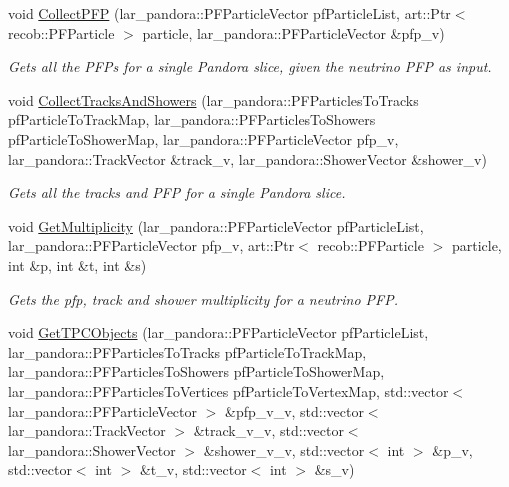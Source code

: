 \begin{DoxyCompactItemize}
\item 
void \hyperlink{group__UBXSec_ga9572bb5f180624d28ed9055591d633eb}{Collect\-P\-F\-P} (lar\-\_\-pandora\-::\-P\-F\-Particle\-Vector pf\-Particle\-List, art\-::\-Ptr$<$ recob\-::\-P\-F\-Particle $>$ particle, lar\-\_\-pandora\-::\-P\-F\-Particle\-Vector \&pfp\-\_\-v)
\begin{DoxyCompactList}\small\item\em Gets all the P\-F\-Ps for a single Pandora slice, given the neutrino P\-F\-P as input. \end{DoxyCompactList}\item 
void \hyperlink{group__UBXSec_ga4742f34e12ae8d756648f606123fe810}{Collect\-Tracks\-And\-Showers} (lar\-\_\-pandora\-::\-P\-F\-Particles\-To\-Tracks pf\-Particle\-To\-Track\-Map, lar\-\_\-pandora\-::\-P\-F\-Particles\-To\-Showers pf\-Particle\-To\-Shower\-Map, lar\-\_\-pandora\-::\-P\-F\-Particle\-Vector pfp\-\_\-v, lar\-\_\-pandora\-::\-Track\-Vector \&track\-\_\-v, lar\-\_\-pandora\-::\-Shower\-Vector \&shower\-\_\-v)
\begin{DoxyCompactList}\small\item\em Gets all the tracks and P\-F\-P for a single Pandora slice. \end{DoxyCompactList}\item 
void \hyperlink{group__UBXSec_gaedb13816ca0eb0d775755a93c593443e}{Get\-Multiplicity} (lar\-\_\-pandora\-::\-P\-F\-Particle\-Vector pf\-Particle\-List, lar\-\_\-pandora\-::\-P\-F\-Particle\-Vector pfp\-\_\-v, art\-::\-Ptr$<$ recob\-::\-P\-F\-Particle $>$ particle, int \&p, int \&t, int \&s)
\begin{DoxyCompactList}\small\item\em Gets the pfp, track and shower multiplicity for a neutrino P\-F\-P. \end{DoxyCompactList}\item 
void \hyperlink{group__UBXSec_gab15442d6254937d3930ea046a93321b9}{Get\-T\-P\-C\-Objects} (lar\-\_\-pandora\-::\-P\-F\-Particle\-Vector pf\-Particle\-List, lar\-\_\-pandora\-::\-P\-F\-Particles\-To\-Tracks pf\-Particle\-To\-Track\-Map, lar\-\_\-pandora\-::\-P\-F\-Particles\-To\-Showers pf\-Particle\-To\-Shower\-Map, lar\-\_\-pandora\-::\-P\-F\-Particles\-To\-Vertices pf\-Particle\-To\-Vertex\-Map, std\-::vector$<$ lar\-\_\-pandora\-::\-P\-F\-Particle\-Vector $>$ \&pfp\-\_\-v\-\_\-v, std\-::vector$<$ lar\-\_\-pandora\-::\-Track\-Vector $>$ \&track\-\_\-v\-\_\-v, std\-::vector$<$ lar\-\_\-pandora\-::\-Shower\-Vector $>$ \&shower\-\_\-v\-\_\-v, std\-::vector$<$ int $>$ \&p\-\_\-v, std\-::vector$<$ int $>$ \&t\-\_\-v, std\-::vector$<$ int $>$ \&s\-\_\-v)

\end{DoxyCompactItemize}
